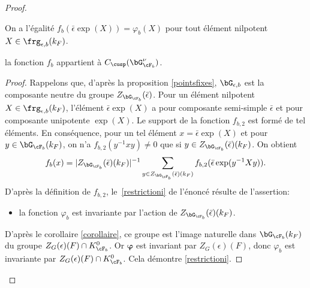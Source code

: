 \begin{proof}
\skpt
\begin{lem*}
\begin{enumeratei}
\item\label{restrictioni}
On a l'égalité $f_{b}(\bar{\epsilon}\exp(X))=\varphi_{b}(X)$ pour tout élément nilpotent $X\in \boldsymbol{\frg}_{\epsilon,b}(k_{F})$.

\item\label{restrictionii}
la fonction $f_{b}$ appartient à $ C_{\cusp}(\bG_{\cF_{b}}^{\nu})$.
\end{enumeratei}
\end{lem*}

\begin{proof}
Rappelons que, d'après la proposition \ref{pointsfixes}, $\bG_{\epsilon,b}$ est la composante neutre du groupe $Z_{\bG_{\cF_{b}}}(\bar{\epsilon})$. Pour un élément nilpotent $X\in \boldsymbol{\frg}_{\epsilon,b}(k_{F})$, l'élément $\bar{\epsilon}\exp(X)$ a pour composante semi-simple $\bar{\epsilon}$ et pour composante unipotente $\exp(X)$. Le support de la fonction $f_{b,2}$ est formé de tel éléments. En conséquence, pour un tel élément $x=\bar{\epsilon}\exp(X)$ et pour $y\in \bG_{\cF_{b}}(k_{F})$, on n'a $f_{b,2}(y^{-1} xy)\neq0$ que si $y\in Z_{\bG_{\cF_{b}}}(\bar{\epsilon})(k_{F})$. On obtient
\[
f_{b}(x)=\vert Z_{\bG_{\cF_{b}}}(\bar{\epsilon})(k_{F})\vert ^{-1}\sum_{y\in Z_{\bG_{\cF_{b}}}(\bar{\epsilon})(k_{F})}f_{b,2}(\bar{\epsilon}\exp(y^{-1}Xy)).
\]
D'après la définition de $f_{b,2}$, le~\eqref{restrictioni} de l'énoncé résulte de l'assertion:
\begin{itemize}
\item
la fonction $\varphi_{b}$ est invariante par l'action de $Z_{\bG_{\cF_{b}}}(\bar{\epsilon})(k_{F})$.
\end{itemize}
D'après le corollaire \ref{corollaire}, ce groupe est l'image naturelle dans $\bG_{\cF_{b}}(k_{F})$ du groupe $Z_{G}(\epsilon)(F)\cap K_{\cF_{b}}^0$. Or $\boldsymbol{\varphi}$ est invariant par $Z_{G}(\epsilon)(F)$, donc $\varphi_{b}$ est invariante par $Z_{G}(\epsilon)(F)\cap K_{\cF_{b}}^0$. Cela démontre \eqref{restrictioni}.


\end{proof}
\end{proof}
